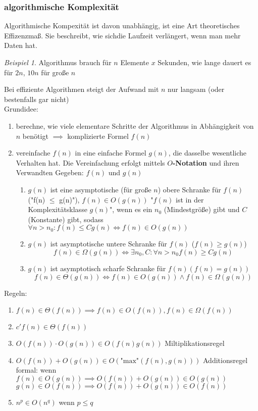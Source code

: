 \documentclass[a4paper]{scrartcl}
\DeclareMathOperator{\Exists}{\exists}%
\DeclareMathOperator{\Forall}{\forall}%
\theoremstyle{definition}
\theoremstyle{plain}
\theoremstyle{remark}
\theoremstyle{remark}
\newtheorem{ex}{Beispiel}
\begin{document}
\subsubsection{algorithmische Komplexität}
\label{sec-15-1-2}
Algorithmische Kompexität ist davon unabhängig, ist eine Art theoretisches Effizenzmaß. Sie
beschreibt, wie sichdie Laufzeit verlängert, wenn man mehr Daten hat.

\begin{ex}
Algorithmus brauch für $n$ Elemente $x$ Sekunden, wie lange dauert es für $2n$, $10n$ für große $n$
\end{ex}
Bei effiziente Algorithmen steigt der Aufwand mit $n$ nur langsam (oder bestenfalls gar nicht) \\
    Grundidee:
\begin{enumerate}
\item berechne, wie viele elementare Schritte der Algorithmus in Abhängigkeit von $n$ benötigt $\implies$ komplizierte Formel $f(n)$
\item vereinfache $f(n)$ in eine einfache Formel $g(n)$, die dasselbe wesentliche Verhalten hat. Die Vereinfachung erfolgt mittels \textbf{$O$-Notation} und ihren Verwandten
Gegeben: $f(n)$ und $g(n)$
\begin{enumerate}
\item $g(n)$ ist eine asymptotische (für große $n$) obere Schranke für $f(n)$ ("f(n) $\le$ g(n)"), $f(n) \in O(g(n))$ "$f(n)$ ist in der Komplexitätsklasse $g(n)$", wenn es ein $n_0$ (Mindestgröße) gibt
und $C$ (Konstante) gibt, sodass $\Forall n > n_0: f(n) \leq C g(n) \iff f(n) \in O(g(n))$
\item $g(n)$ ist asymptotische untere Schranke für $f(n)$ ($f(n) \geq g(n)$)
\[f(n) \in \Omega(g(n)) \iff \Exists n_0,C : \Forall n > n_0 f(n) \geq C g(n)\]
\item $g(n)$ ist asymptotisch scharfe Schranke für $f(n) (f(n) = g(n))$
          \[f(n) \in \Theta(g(n)) \iff f(n) \in O(g(n)) \wedge f(n) \in \Omega(g(n))\]
\end{enumerate}
\end{enumerate}
Regeln:
\begin{enumerate}
\item $f(n) \in \Theta(f(n)) \implies f(n) \in O(f(n)), f(n) \in \Omega(f(n))$
\item $c' f(n) \in \Theta(f(n))$
\item $O(f(n)) \cdot O(g(n)) \in O(f(n) g(n))$ \hfill Miltiplikationsregel
\item $O(f(n)) + O(g(n)) \in O(\text{"max"}(f(n), g(n)))$ \hfill Additionsregel \\
       formal: wenn $f(n) \in O(g(n)) \implies O(f(n)) + O(g(n)) \in O(g(n))$ \\
       $g(n) \in O(f(n)) \implies O(f(n)) + O(g(n)) \in O(f(n))$
\item $n^p \in O(n^q)$ wenn $p \leq q$
\end{enumerate}
\end{document}
